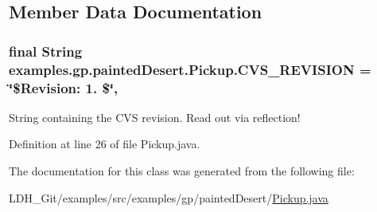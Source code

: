\subsection{Member Data Documentation}
\hypertarget{classexamples_1_1gp_1_1painted_desert_1_1_pickup_a858e1accf3e22b22408daab8496a23dc}{
\subsubsection[{C\-V\-S\-\_\-\-R\-E\-V\-I\-S\-I\-O\-N}]{\setlength{\rightskip}{0pt plus 5cm}final String examples.\-gp.\-painted\-Desert.\-Pickup.\-C\-V\-S\-\_\-\-R\-E\-V\-I\-S\-I\-O\-N = \char`\"{}\$Revision\-: 1. \$\char`\"{}\hspace{0.3cm}{\ttfamily [static]}, {\ttfamily [private]}}}\label{classexamples_1_1gp_1_1painted_desert_1_1_pickup_a858e1accf3e22b22408daab8496a23dc}
String containing the C\-V\-S revision. Read out via reflection! 

Definition at line 26 of file Pickup.\-java.



The documentation for this class was generated from the following file\-:\begin{DoxyCompactItemize}
\item 
L\-D\-H\-\_\-\-Git/examples/src/examples/gp/painted\-Desert/\hyperlink{_pickup_8java}{Pickup.\-java}\end{DoxyCompactItemize}
